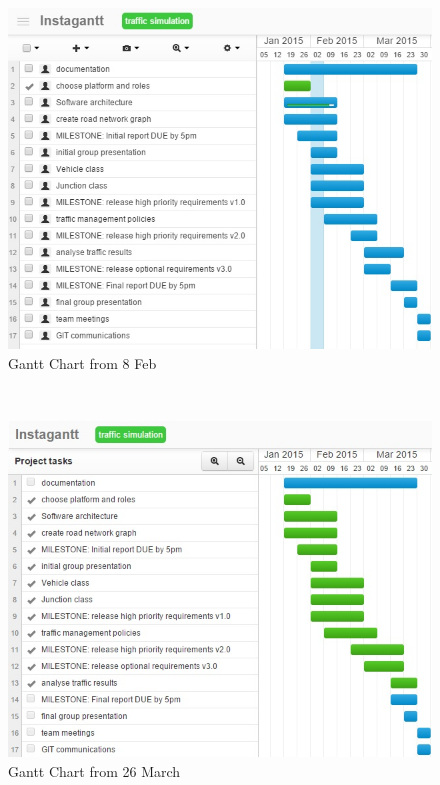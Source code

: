 \documentclass[11pt]{article}
\begin{document}
\begin{enumerate}
\begin{figure}
\begin{center}
\includegraphics[scale=1.0]{gantt8Feb}
\caption{Gantt Chart from 8 Feb}
\end{center}
\end{figure}

\\

\begin{figure}
\begin{center}
\includegraphics[scale=0.8]{gantt26Mar}
\caption{Gantt Chart from 26 March}
\end{center}
\end{figure}



\end{enumerate}
\end{document}
